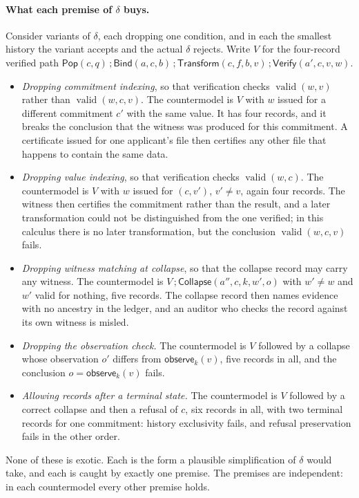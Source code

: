 \documentclass[11pt,openany]{book}
\theoremstyle{remark}
\newcommand{\Pop}{\mathsf{Pop}}
\newcommand{\Bind}{\mathsf{Bind}}
\newcommand{\Transform}{\mathsf{Transform}}
\newcommand{\Verify}{\mathsf{Verify}}
\newcommand{\Collapse}{\mathsf{Collapse}}
\newcommand{\valid}{\operatorname{valid}}
\begin{document}
\paragraph{What each premise of $\delta$ buys.} Consider variants of
$\delta$, each dropping one condition, and in each the smallest history
the variant accepts and the actual $\delta$ rejects. Write $V$ for the
four-record verified path
$\Pop(c,q)\,;\Bind(a,c,b)\,;\Transform(c,f,b,v)\,;\Verify(a',c,v,w)$.
\begin{itemize}[leftmargin=1.5em]
\item \emph{Dropping commitment indexing}, so that verification checks
$\valid(w,v)$ rather than $\valid(w,c,v)$. The countermodel is $V$ with
$w$ issued for a different commitment $c'$ with the same value. It has
four records, and it breaks the conclusion that the witness was produced
for this commitment. A certificate issued for one applicant's file then
certifies any other file that happens to contain the same data.
\item \emph{Dropping value indexing}, so that verification checks
$\valid(w,c)$. The countermodel is $V$ with $w$ issued for $(c,v')$,
$v'\ne v$, again four records. The witness then certifies the commitment
rather than the result, and a later transformation could not be
distinguished from the one verified; in this calculus there is no later
transformation, but the conclusion $\valid(w,c,v)$ fails.
\item \emph{Dropping witness matching at collapse}, so that the collapse
record may carry any witness. The countermodel is
$V\,;\Collapse(a'',c,k,w',o)$ with $w'\ne w$ and $w'$ valid for nothing, five records. The collapse
record then names evidence with no ancestry in the ledger, and an auditor
who checks the record against its own witness is misled.
\item \emph{Dropping the observation check.} The countermodel is $V$
followed by a collapse whose observation $o'$ differs from
$\mathsf{observe}_k(v)$, five records in all, and the conclusion
$o=\mathsf{observe}_k(v)$ fails.
\item \emph{Allowing records after a terminal state.} The countermodel is
$V$ followed by a correct collapse and then a refusal of $c$, six records
in all, with two terminal records for one commitment: history exclusivity fails, and
refusal preservation fails in the other order.
\end{itemize}
None of these is exotic. Each is the form a plausible simplification of
$\delta$ would take, and each is caught by exactly one premise. The
premises are independent: in each countermodel every other premise
holds.
\end{document}
